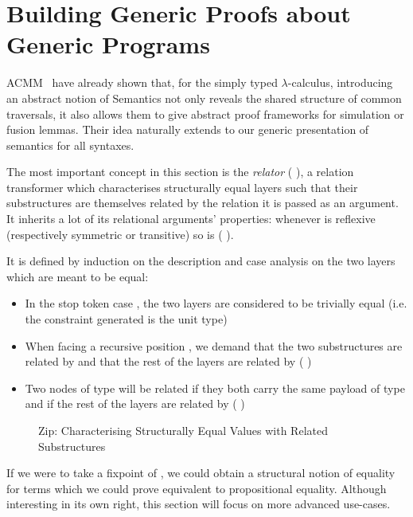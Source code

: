 

\section{Building Generic Proofs about Generic Programs}

ACMM~\citeyear{allais2017type} have
already shown that, for the simply typed $\lambda$-calculus, introducing an abstract
notion of Semantics not only reveals the shared structure of common
traversals, it also allows them to give abstract proof frameworks for
simulation or fusion lemmas. Their idea naturally extends to our generic
presentation of semantics for all syntaxes.

The most important concept in this section is the \emph{relator} (  ),
a relation transformer which characterises structurally equal layers such that their
substructures are themselves related by the relation it is passed as an
argument. It inherits a lot of its relational arguments' properties: whenever
 is reflexive (respectively symmetric or transitive) so is {(   )}.\label{lem:zipstable}

It is defined by induction on the description and case analysis on the two
layers which are meant to be equal:
\begin{itemize}
  \item In the stop token case  , the two layers are considered to
    be trivially equal (i.e. the constraint generated is the unit type)
  \item When facing a recursive position { \AB{$\Delta$}  }, we
    demand that the two substructures are related by { \AB{$\Delta$} }
    and that the rest of the layers are related by (   )
  \item Two nodes of type {  } will
    be related if they both carry the same payload  of type  and if
    the rest of the layers are related by (    )
\end{itemize}

\begin{figure}[h]
\caption{Zip: Characterising Structurally Equal Values with Related Substructures}
\end{figure}

If we were to take a fixpoint of , we could obtain a structural
notion of equality for terms which we could prove equivalent to propositional
equality. Although interesting in its own right, this section will focus
on more advanced use-cases.

